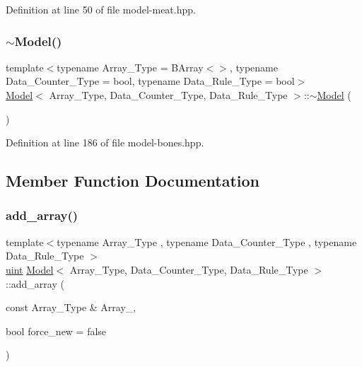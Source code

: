 Definition at line 50 of file model-\/meat.\+hpp.

\mbox{\label{class_model_a0eba131af14e1ceefc7748323e9fb4bf}} 
\subsubsection{\texorpdfstring{$\sim$\+Model()}{~Model()}}
{\footnotesize\ttfamily template$<$typename Array\+\_\+\+Type = B\+Array$<$$>$, typename Data\+\_\+\+Counter\+\_\+\+Type = bool, typename Data\+\_\+\+Rule\+\_\+\+Type = bool$>$ \\
\hyperlink{class_model}{Model}$<$ Array\+\_\+\+Type, Data\+\_\+\+Counter\+\_\+\+Type, Data\+\_\+\+Rule\+\_\+\+Type $>$\+::$\sim$\hyperlink{class_model}{Model} (\begin{DoxyParamCaption}{ }\end{DoxyParamCaption})\hspace{0.3cm}{\ttfamily [inline]}}



Definition at line 186 of file model-\/bones.\+hpp.



\subsection{Member Function Documentation}
\mbox{\label{class_model_a17a2205b52c03bb29eefb8fb126a01f6}} 
\subsubsection{\texorpdfstring{add\+\_\+array()}{add\_array()}}
{\footnotesize\ttfamily template$<$typename Array\+\_\+\+Type , typename Data\+\_\+\+Counter\+\_\+\+Type , typename Data\+\_\+\+Rule\+\_\+\+Type $>$ \\
\hyperlink{typedefs_8hpp_a91ad9478d81a7aaf2593e8d9c3d06a14}{uint} \hyperlink{class_model}{Model}$<$ Array\+\_\+\+Type, Data\+\_\+\+Counter\+\_\+\+Type, Data\+\_\+\+Rule\+\_\+\+Type $>$\+::add\+\_\+array (\begin{DoxyParamCaption}\item[{const Array\+\_\+\+Type \&}]{Array\+\_\+,  }\item[{bool}]{force\+\_\+new = {\ttfamily false} }\end{DoxyParamCaption})\hspace{0.3cm}{\ttfamily [inline]}}



